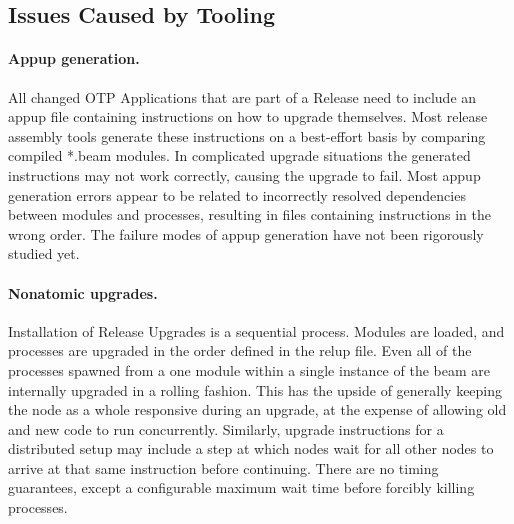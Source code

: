 \cleardoublepage
\subsection{Issues Caused by Tooling}

\paragraph{Appup generation.} All changed OTP Applications that are part of a Release need to include an \acrlong{appup} file containing instructions on how to upgrade themselves. Most release assembly tools generate these instructions on a best-effort basis by comparing compiled *.beam modules. In complicated upgrade situations the generated instructions may not work correctly, causing the upgrade to fail. Most \acrshort{appup} generation errors appear to be related to incorrectly resolved dependencies between modules and processes, resulting in files containing instructions in the wrong order. The failure modes of \acrshort{appup} generation have not been rigorously studied yet.

\paragraph{Nonatomic upgrades.}
Installation of Release Upgrades is a sequential process. Modules are loaded, and processes are upgraded in the order defined in the \acrshort{relup} file. Even all of the processes spawned from a one module within a single instance of the \acrshort{beam} are internally upgraded in a rolling fashion. This has the upside of generally keeping the node as a whole responsive during an upgrade, at the expense of allowing old and new code to run concurrently. Similarly, upgrade instructions for a distributed setup may include a step at which nodes wait for all other nodes to arrive at that same instruction before continuing. There are no timing guarantees, except a configurable maximum wait time before forcibly killing processes.

